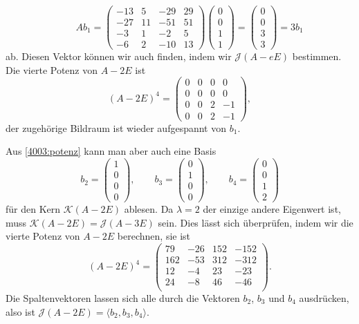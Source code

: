 \begin{loesung}
\[\qquad
Ab_1 = 
\begin{pmatrix}
-13&  5& -29& 29\\
-27& 11& -51& 51\\
 -3&  1&  -2&  5\\
 -6&  2& -10& 13
\end{pmatrix}
\begin{pmatrix} 0\\0\\1\\1\end{pmatrix}
=
\begin{pmatrix}
0\\0\\3\\3
\end{pmatrix}
=
3b_1
\]
ab.
Diesen  Vektor können wir auch finden, indem wir $\mathcal{J}(A-eE)$
bestimmen.
Die vierte Potenz von $A-2E$ ist
\begin{equation}
(A-2E)^4
=
\begin{pmatrix}
   0&  0&  0&  0\\
   0&  0&  0&  0\\
   0&  0&  2& -1\\
   0&  0&  2& -1
\end{pmatrix},
\label{4003:potenz}
\end{equation}
der zugehörige Bildraum ist wieder aufgespannt von $b_1$.

Aus \eqref{4003:potenz} kann man aber auch eine Basis
\[
b_2
=
\begin{pmatrix}1\\0\\0\\0\end{pmatrix}
,\qquad
b_3
=
\begin{pmatrix}0\\1\\0\\0\end{pmatrix}
,\qquad
b_4
=
\begin{pmatrix}0\\0\\1\\2\end{pmatrix}
\]
für den Kern $\mathcal{K}(A-2E)$ ablesen.
Da $\lambda=2$ der einzige andere Eigenwert ist, muss $\mathcal{K}(A-2E)
= \mathcal{J}(A-3E)$ sein.
Dies lässt sich überprüfen, indem wir die vierte Potenz von $A-2E$
berechnen, sie ist
\[
(A-2E)^4
=
\begin{pmatrix}
    79&  -26&  152& -152\\
   162&  -53&  312& -312\\
    12&   -4&   23&  -23\\
    24&   -8&   46&  -46\\
\end{pmatrix}.
\]
Die Spaltenvektoren lassen sich alle durch die Vektoren $b_2$, $b_3$
und $b_4$ ausdrücken, also ist $\mathcal{J}(A-2E)=\langle b_2,b_3,b_4\rangle$.


\end{loesung}
